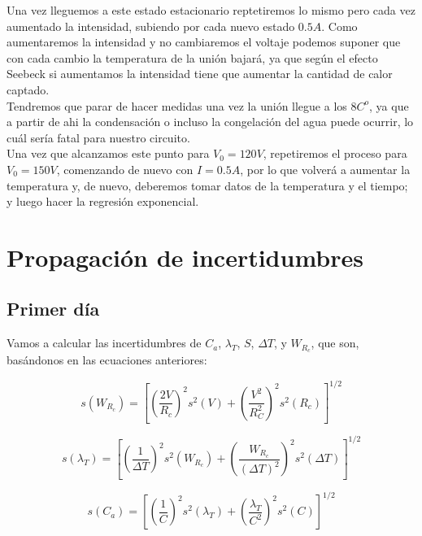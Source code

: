 \documentclass[12pt,a4paper]{article}
\newcommand{\parentesis}[1]{\left( #1  \right)}
\newcommand{\ccorchetes}[1]{\left[ #1  \right]}
\begin{document}
Una vez lleguemos a este estado estacionario reptetiremos lo mismo pero cada vez aumentado la intensidad, subiendo por cada nuevo estado $0.5A$. Como aumentaremos la intensidad y no cambiaremos el voltaje podemos suponer que con cada cambio la temperatura de la unión bajará, ya que según el efecto Seebeck si aumentamos la intensidad tiene que aumentar la cantidad de calor captado. \\

Tendremos que parar de hacer medidas una vez la unión llegue a los $8 C^o$, ya que a partir de ahi la condensación o incluso la congelación del agua puede ocurrir, lo cuál sería fatal para nuestro circuito. \\

Una vez que alcanzamos este punto para $V_0 =120V$, repetiremos el proceso para $V_0 = 150 V$, comenzando de nuevo con $I=0.5 A$, por lo que volverá a aumentar la temperatura y, de nuevo, deberemos tomar datos de la temperatura y el tiempo; y luego hacer la regresión exponencial. 












\newpage

\section{Propagación de incertidumbres}

\subsection{Primer día}

Vamos a calcular las incertidumbres de $C_a$, $\lambda_T$, $S$, $\Delta T$, y $W_{R_c}$, que son, basándonos en las ecuaciones anteriores:

\begin{equation}
s(W_{R_c}) = \ccorchetes{\parentesis{\dfrac{2V}{R_c}}^2 s^2(V)+
\parentesis{\dfrac{V^2}{R_C^2}}^2 s^2(R_c)}^{1/2}
\end{equation}


\begin{equation}
s(\lambda_T) = \ccorchetes{\parentesis{\dfrac{1}{\Delta T}}^2 s^2(W_{R_c})+  \parentesis{\dfrac{W_{R_c}}{(\Delta T)^2}}^2 s^2(\Delta T) }^{1/2}
\end{equation}


\begin{equation}
s(C_a) = \ccorchetes{\parentesis{\dfrac{1}{C}}^2 s^2(\lambda_T)+  \parentesis{\dfrac{\lambda_T}{C^2}}^2 s^2(C) }^{1/2}
\end{equation}
\end{document}
